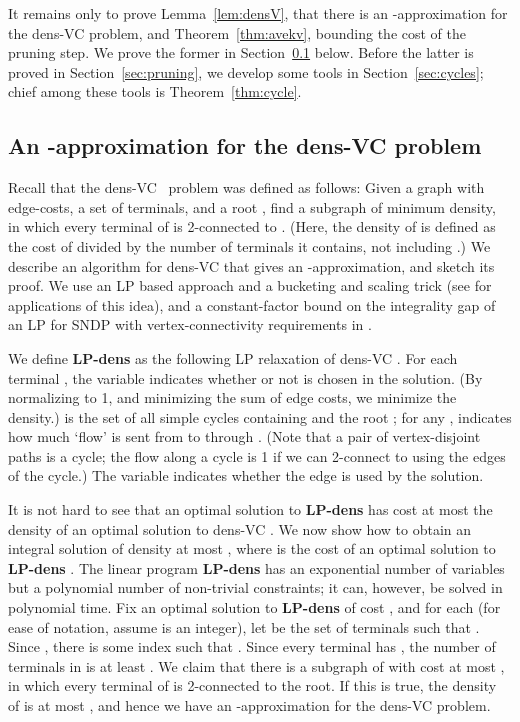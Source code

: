 \documentclass[11pt]{article}
\newcommand{\densV}{dens-{\sc VC} }
\newcommand{\densLP}{{\bf LP-dens} }
\begin{document}
\bigskip
It remains only to prove Lemma~\ref{lem:densV}, that there is an -approximation for the \densV problem, and
Theorem~\ref{thm:avekv}, bounding the cost of the pruning step. We
prove the former in Section~\ref{subsec:LP} below. Before the latter
is proved in Section~\ref{sec:pruning}, we develop some tools in
Section~\ref{sec:cycles}; chief among these tools is
Theorem~\ref{thm:cycle}. 

\subsection{An -approximation for the \densV problem}
\label{subsec:LP}

Recall that the \densV~problem was defined as follows: Given a graph
 with edge-costs, a set  of terminals, and a
root , find a subgraph  of minimum density, in which
every terminal of  is 2-connected to . (Here, the density of 
is defined as the cost of  divided by the number of terminals it
contains, not including .)  We describe an algorithm for \densV
that gives an -approximation, and sketch its proof. We
use an LP based approach and a bucketing and scaling trick (see
\cite{ChekuriEGS08,ChekuriHKS06,ChekuriHKS07} for applications of this
idea), and a constant-factor bound on the integrality gap of an LP for
SNDP with vertex-connectivity requirements in 
\cite{FleischerJW}.

\bigskip
We define \densLP as the following LP relaxation of \densV. For each
terminal , the variable  indicates whether or not  is
chosen in the solution. (By normalizing  to 1, and
minimizing the sum of edge costs, we minimize the density.)
 is the set of all simple cycles containing  and the
root ; for any ,  indicates how much
`flow' is sent from  to  through . (Note that a pair of
vertex-disjoint paths is a cycle; the flow along a cycle is 1 if we
can 2-connect  to  using the edges of the cycle.) The variable
 indicates whether the edge  is used by the solution.

\newpage

\vspace{-0.15in}


\vspace{-0.15in}
It is not hard to see that an optimal solution to \densLP has cost at
most the density of an optimal solution to \densV. We now show how to
obtain an integral solution of density at most , where  is the cost of an optimal solution to
\densLP.  The linear program \densLP has an exponential number of
variables but a polynomial number of non-trivial constraints; it can,
however, be solved in polynomial time. Fix an optimal solution to
\densLP of cost , and for each  (for
ease of notation, assume  is an integer), let  be the
set of terminals  such that . Since
, there is some index  such that . Since every terminal  has , the number of terminals in  is at
least .  We claim that there is a subgraph
 of  with cost at most , in which every
terminal of  is 2-connected to the root. If this is true, the
density of  is at most , and hence we
have an -approximation for the \densV problem.
\end{document}
